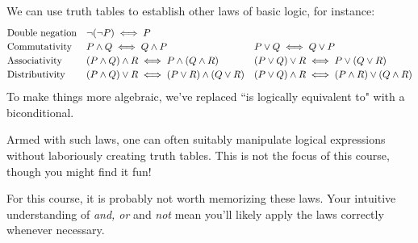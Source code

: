 \begin{aside}{}{}
\label{pg:asidelogicalgebra}

We can use truth tables to establish other laws of basic logic, for instance:
\[
	\def\arraystretch{1.2}
	\begin{array}{@{}lll@{}}
	\text{Double negation} & \neg(\neg P)\iff P &\\
	\text{Commutativity} & P\wedge Q\iff Q\wedge P & P\vee Q\iff Q\vee P\\
	\text{Associativity} & (P\wedge Q)\wedge R\iff P\wedge(Q\wedge R) & (P\vee Q)\vee R\iff P\vee(Q\vee R)\\
	\text{Distributivity}&(P\wedge Q)\vee R\iff (P\vee R)\wedge (Q\vee R) & (P\vee Q)\wedge R\iff (P\wedge R)\vee (Q\wedge R)
	\end{array}
\]
To make things more algebraic, we've replaced ``is logically equivalent to" with a biconditional.\footnotemark{}\smallbreak

Armed with such laws, one can often suitably manipulate logical expressions without laboriously creating truth tables. This is not the focus of this course, though you might find it fun!\smallbreak

For this course, it is probably not worth memorizing these laws. Your intuitive understanding of \emph{and, or} and \emph{not} mean you'll likely apply the laws correctly whenever necessary.
\end{aside}


\goodbreak

